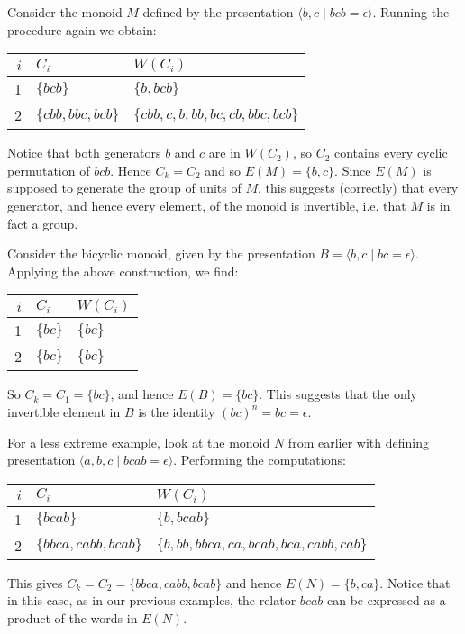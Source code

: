 \documentclass[noindex,noinsetproof,12pt]{lmaths}
\begin{document}
\begin{example} \label{ex:Ck-group}
	Consider the monoid $M$ defined by the presentation $\langle b, c \mid bcb = \epsilon \rangle$. Running the procedure again we obtain:

	\begin{center}
	\renewcommand{\arraystretch}{1.2}
	\begin{tabular}{r|ll}
		$i$ & $C_i$ & $W(C_i)$ \\ \hline
		1 & $\{bcb\}$ & $\{b, bcb\}$ \\
		2 & $\{cbb, bbc, bcb\}$ & $\{cbb, c, b, bb, bc, cb, bbc, bcb\}$
	\end{tabular}
	\end{center}

	Notice that both generators $b$ and $c$ are in $W(C_2)$, so $C_2$ contains every cyclic permutation of $bcb$. Hence $C_k = C_2$ and so $E(M) = \{ b, c\}$. Since $E(M)$ is supposed to generate the group of units of $M$, this suggests (correctly) that every generator, and hence every element, of the monoid is invertible, i.e. that $M$ is in fact a group. 
\end{example}

\begin{example}
	Consider the bicyclic monoid, given by the presentation $B = \langle b, c \mid bc = \epsilon \rangle$.
	Applying the above construction, we find:

	\begin{center}
	\renewcommand{\arraystretch}{1.2}
	\begin{tabular}{r|ll}
		$i$ & $C_i$ & $W(C_i)$ \\ \hline
		1 & $\{bc\}$ & $\{bc\}$ \\
		2 & $\{bc\}$ & $\{bc\}$
	\end{tabular}
	\end{center}

	So $C_k = C_1 = \{ bc \}$, and hence $E(B) = \{bc\}$. This suggests that the only invertible element in $B$ is the identity $(bc)^n = bc = \epsilon$.
\end{example}

\begin{example} \label{ex:monoidN}
	For a less extreme example, look at the monoid $N$ from earlier with defining presentation $\langle a, b, c \mid bcab = \epsilon\rangle$. Performing the computations:

	\begin{center}
	\renewcommand{\arraystretch}{1.2}
	\begin{tabular}{r|ll}
		$i$ & $C_i$ & $W(C_i)$ \\ \hline
		1 & $\{bcab\}$ & $\{b, bcab\}$ \\
		2 & $\{bbca, cabb, bcab\}$ & $\{b, bb, bbca, ca, bcab, bca, cabb, cab\}$
	\end{tabular}
	\end{center}

	This gives $C_k = C_2 = \{bbca, cabb, bcab\}$ and hence $E(N) = \{b, ca\}$. Notice that in this case, as in our previous examples, the relator $bcab$ can be expressed as a product of the words in $E(N)$.

\end{example}
\end{document}
